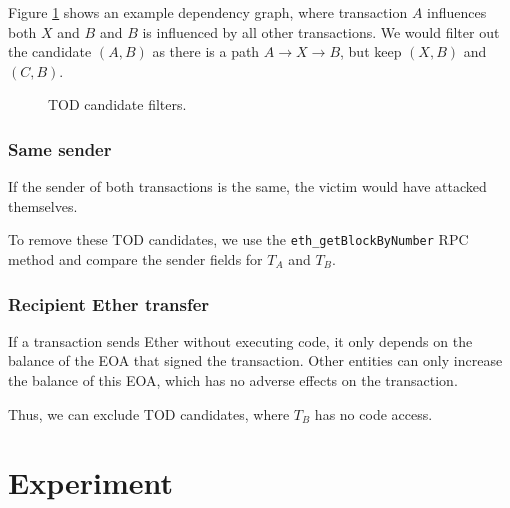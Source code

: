 \documentclass[draft,final]{vutinfth} %
\begin{document}
Figure \ref{fig:tod_candidate_dependency} shows an example dependency graph, where transaction $A$ influences both $X$ and $B$ and $B$ is influenced by all other transactions. We would filter out the candidate $(A, B)$ as there is a path $A \rightarrow X \rightarrow B$, but keep $(X, B)$ and $(C, B)$.

\begin{figure}[h]
    \centering
    \caption{TOD candidate filters.}
    \label{fig:tod_candidate_dependency}
\end{figure}

\subsubsection{Same sender}

If the sender of both transactions is the same, the victim would have attacked themselves.

To remove these TOD candidates, we use the \verb|eth_getBlockByNumber| RPC method and compare the sender fields for $T_A$ and $T_B$.

\subsubsection{Recipient Ether transfer}

If a transaction sends Ether without executing code, it only depends on the balance of the EOA that signed the transaction. Other entities can only increase the balance of this EOA, which has no adverse effects on the transaction.

Thus, we can exclude TOD candidates, where $T_B$ has no code access.

\section{Experiment}
\end{document}
